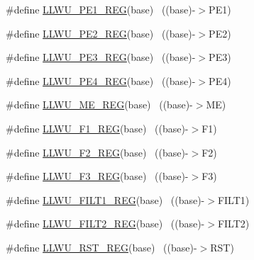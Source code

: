 \begin{DoxyCompactItemize}
\#define \hyperlink{group___l_l_w_u___register___accessor___macros_gada86612bb2a3cb6d479429beaca258a8}{L\+L\+W\+U\+\_\+\+P\+E1\+\_\+\+R\+EG}(base)                                          ~((base)-\/$>$P\+E1)
\item 
\#define \hyperlink{group___l_l_w_u___register___accessor___macros_ga13e23bebded99c5538c165fec2ffa41f}{L\+L\+W\+U\+\_\+\+P\+E2\+\_\+\+R\+EG}(base)                                          ~((base)-\/$>$P\+E2)
\item 
\#define \hyperlink{group___l_l_w_u___register___accessor___macros_ga0b72bd64b08303c30d4de21aa8bb06b8}{L\+L\+W\+U\+\_\+\+P\+E3\+\_\+\+R\+EG}(base)                                          ~((base)-\/$>$P\+E3)
\item 
\#define \hyperlink{group___l_l_w_u___register___accessor___macros_gaff14d2acccbae996be61c4ba7893024f}{L\+L\+W\+U\+\_\+\+P\+E4\+\_\+\+R\+EG}(base)                                          ~((base)-\/$>$P\+E4)
\item 
\#define \hyperlink{group___l_l_w_u___register___accessor___macros_gad2163c47741ae9561ed0cf28003dc06d}{L\+L\+W\+U\+\_\+\+M\+E\+\_\+\+R\+EG}(base)                                            ~((base)-\/$>$ME)
\item 
\#define \hyperlink{group___l_l_w_u___register___accessor___macros_ga3f4c680add377053731e36faf88c85c2}{L\+L\+W\+U\+\_\+\+F1\+\_\+\+R\+EG}(base)                                            ~((base)-\/$>$F1)
\item 
\#define \hyperlink{group___l_l_w_u___register___accessor___macros_ga9824713b71d34e05dd1783c6e0153a3c}{L\+L\+W\+U\+\_\+\+F2\+\_\+\+R\+EG}(base)                                            ~((base)-\/$>$F2)
\item 
\#define \hyperlink{group___l_l_w_u___register___accessor___macros_ga8369b30780db4c76aa70c8adf1a763fa}{L\+L\+W\+U\+\_\+\+F3\+\_\+\+R\+EG}(base)                                            ~((base)-\/$>$F3)
\item 
\#define \hyperlink{group___l_l_w_u___register___accessor___macros_ga1c17851f00a54116b482596824ddd13c}{L\+L\+W\+U\+\_\+\+F\+I\+L\+T1\+\_\+\+R\+EG}(base)                                      ~((base)-\/$>$F\+I\+L\+T1)
\item 
\#define \hyperlink{group___l_l_w_u___register___accessor___macros_ga5b8d2b94b1ac6dfdf82b7eaee7760152}{L\+L\+W\+U\+\_\+\+F\+I\+L\+T2\+\_\+\+R\+EG}(base)                                      ~((base)-\/$>$F\+I\+L\+T2)
\item 
\#define \hyperlink{group___l_l_w_u___register___accessor___macros_ga2cd305f92495adf56b038b6f98471e2d}{L\+L\+W\+U\+\_\+\+R\+S\+T\+\_\+\+R\+EG}(base)                                          ~((base)-\/$>$R\+ST)

\end{DoxyCompactItemize}
